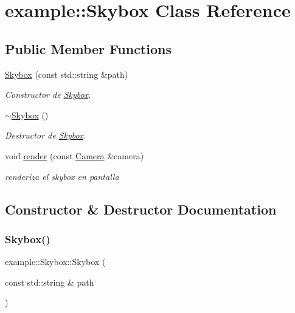 \hypertarget{classexample_1_1_skybox}{}\section{example\+::Skybox Class Reference}
\label{classexample_1_1_skybox}
\subsection*{Public Member Functions}
\begin{DoxyCompactItemize}
\item 
\mbox{\hyperlink{classexample_1_1_skybox_a5538b8432a1cac4898864c8056b67143}{Skybox}} (const std\+::string \&path)
\begin{DoxyCompactList}\small\item\em Constructor de \mbox{\hyperlink{classexample_1_1_skybox}{Skybox}}. \end{DoxyCompactList}\item 
\mbox{\hyperlink{classexample_1_1_skybox_abeed66eef405ebc5d29a4bdd949210d8}{$\sim$\+Skybox}} ()
\begin{DoxyCompactList}\small\item\em Destructor de \mbox{\hyperlink{classexample_1_1_skybox}{Skybox}}. \end{DoxyCompactList}\item 
void \mbox{\hyperlink{classexample_1_1_skybox_a0f6edb0a0b5b81cb31c55b9207a82ad6}{render}} (const \mbox{\hyperlink{classexample_1_1_camera}{Camera}} \&camera)
\begin{DoxyCompactList}\small\item\em renderiza el skybox en pantalla \end{DoxyCompactList}\end{DoxyCompactItemize}


\subsection{Constructor \& Destructor Documentation}
\mbox{\label{classexample_1_1_skybox_a5538b8432a1cac4898864c8056b67143}} 
\subsubsection{\texorpdfstring{Skybox()}{Skybox()}}
{\footnotesize\ttfamily example\+::\+Skybox\+::\+Skybox (\begin{DoxyParamCaption}\item[{const std\+::string \&}]{path }\end{DoxyParamCaption})}




